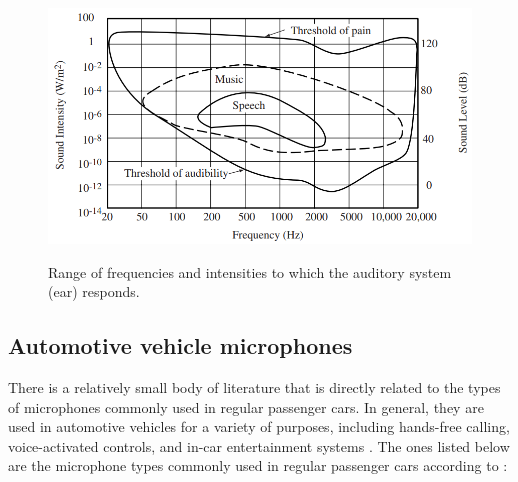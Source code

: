 \begin{figure}[htbp]
    \raggedright
        \caption{Range of frequencies and intensities to which the auditory system (ear) responds.}
        \includegraphics[width=1\textwidth]{resources/images/030-theoretical_framework/Framework_microphone_human_hearing.png}
        \label{fig:frmwk_microphone_human_hearing}
\end{figure}


\subsection{Automotive vehicle microphones}
\label{subsec:microphones_automotive_vehicle}

There is a relatively small body of literature that is directly related to the types of microphones commonly used in regular passenger cars. In general, they are used in automotive vehicles for a variety of purposes, including hands-free calling, voice-activated controls, and in-car entertainment systems \cite{Newcomb2008}. The ones listed below are the microphone types commonly used in regular passenger cars according to \textcite{Rumreich2005}:

